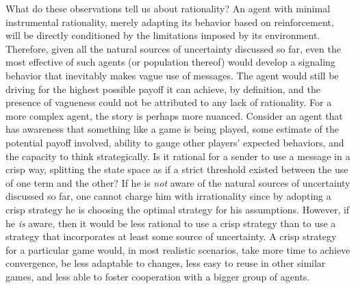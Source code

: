 \documentclass[a4paper]{article}
\begin{document}
What do these observations tell us about rationality?
An agent with minimal instrumental rationality, merely adapting its behavior based on reinforcement, will be directly conditioned by the limitations imposed by its environment.
Therefore, given all the natural sources of uncertainty discussed so far, even the most effective of such agents (or population thereof) would develop a signaling behavior that inevitably makes vague use of messages.
The agent would still be driving for the highest possible payoff it can achieve, by definition, and the presence of vagueness could not be attributed to any lack of rationality.
For a more complex agent, the story is perhaps more nuanced.
Consider an agent that has awareness that something like a game is being played, some estimate of the potential payoff involved, ability to gauge other players' expected behaviors, and the capacity to think strategically.
Is it rational for a sender to use a message in a crisp way, splitting the state space as if a strict threshold existed between the use of one term and the other?
If he is \emph{not} aware of the natural sources of uncertainty discussed so far, one cannot charge him with irrationality since by adopting a crisp strategy he is choosing the optimal strategy for his assumptions.
However, if he \emph{is} aware, then it would be less rational to use a crisp strategy than to use a strategy that incorporates at least some source of uncertainty.
A crisp strategy for a particular game would, in most realistic scenarios, take more time to achieve convergence, be less adaptable to changes, less easy to reuse in other similar games, and less able to foster cooperation with a bigger group of agents.





\printbibliography
\end{document}
